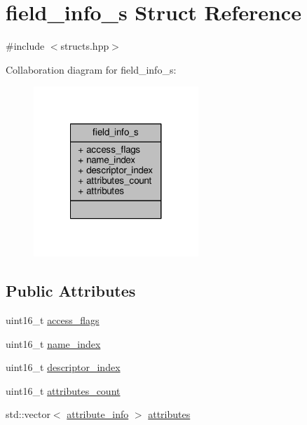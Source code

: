 \hypertarget{structfield__info__s}{\section{field\+\_\+info\+\_\+s Struct Reference}
\label{structfield__info__s}
}


{\ttfamily \#include $<$structs.\+hpp$>$}



Collaboration diagram for field\+\_\+info\+\_\+s\+:\nopagebreak
\begin{figure}[H]
\begin{center}
\leavevmode
\includegraphics[width=176pt]{structfield__info__s__coll__graph}
\end{center}
\end{figure}
\subsection*{Public Attributes}
\begin{DoxyCompactItemize}
\item 
uint16\+\_\+t \hyperlink{structfield__info__s_a51cb65a206e19f1ef167f808fd0dd34a}{access\+\_\+flags}
\item 
uint16\+\_\+t \hyperlink{structfield__info__s_ae6ad0227620df9c8733e10a29b320957}{name\+\_\+index}
\item 
uint16\+\_\+t \hyperlink{structfield__info__s_acf1b97dc1bf435aa19f77bc6131a7055}{descriptor\+\_\+index}
\item 
uint16\+\_\+t \hyperlink{structfield__info__s_ada4b62d8b973680b456f6c397db8cb11}{attributes\+\_\+count}
\item 
std\+::vector$<$ \hyperlink{attributes_8hpp_a7af51299ff517acce960ac87c9db9899}{attribute\+\_\+info} $>$ \hyperlink{structfield__info__s_a77c8bf8802039e9dbf1b3b69a55ace29}{attributes}
\end{DoxyCompactItemize}


